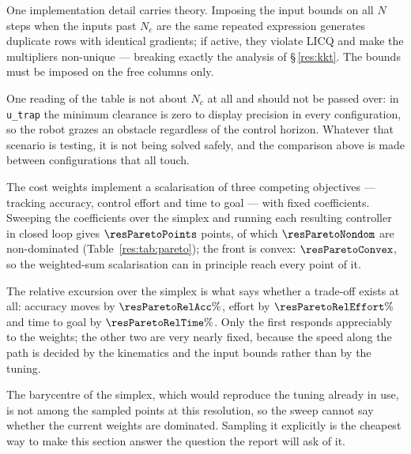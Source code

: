 One implementation detail carries theory. Imposing the input bounds on all $N$ steps when the inputs past $N_c$ are the same repeated expression generates duplicate rows with identical gradients; if active, they violate LICQ and make the multipliers non-unique --- breaking exactly the analysis of \S\,\ref{res:kkt}. The bounds must be imposed on the free columns only.

One reading of the table is not about $N_c$ at all and should not be passed over: in \texttt{u\_trap} the minimum clearance is zero to display precision in every configuration, so the robot grazes an obstacle regardless of the control horizon. Whatever that scenario is testing, it is not being solved safely, and the comparison above is made between configurations that all touch.


\label{res:pareto}


The cost weights implement a scalarisation of three competing objectives --- tracking accuracy, control effort and time to goal --- with fixed coefficients. Sweeping the coefficients over the simplex and running each resulting controller in closed loop gives $\resParetoPoints$ points, of which $\resParetoNondom$ are non-dominated (Table~\ref{res:tab:pareto}); the front is convex: $\resParetoConvex$, so the weighted-sum scalarisation can in principle reach every point of it.

The relative excursion over the simplex is what says whether a trade-off exists at all: accuracy moves by $\resParetoRelAcc\%$, effort by $\resParetoRelEffort\%$ and time to goal by $\resParetoRelTime\%$. Only the first responds appreciably to the weights; the other two are very nearly fixed, because the speed along the path is decided by the kinematics and the input bounds rather than by the tuning.

The barycentre of the simplex, which would reproduce the tuning already in use, is not among the sampled points at this resolution, so the sweep cannot say whether the current weights are dominated. Sampling it explicitly is the cheapest way to make this section answer the question the report will ask of it.


